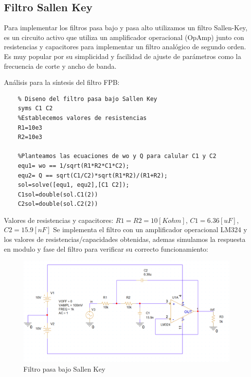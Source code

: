 \documentclass[12pt]{article}
\begin{document}
	\subsection{Filtro Sallen Key}
	Para implementar los filtros pasa bajo y pasa alto utilizamos un filtro Sallen-Key, es un circuito activo que utiliza un amplificador operacional (OpAmp) junto con resistencias y capacitores para implementar un filtro analógico de segundo orden. Es muy popular por su simplicidad y facilidad de ajuste de parámetros como la frecuencia de corte y ancho de banda.\newpage
	
	Análisis para la síntesis del filtro FPB:
	\begin{lstlisting}
	% Diseno del filtro pasa bajo Sallen Key
	syms C1 C2
	%Establecemos valores de resistencias
	R1=10e3
	R2=10e3
	
	%Planteamos las ecuaciones de wo y Q para calular C1 y C2
	equ1= wo == 1/sqrt(R1*R2*C1*C2);
	equ2= Q == sqrt(C1/C2)*sqrt(R1*R2)/(R1+R2);
	sol=solve([equ1, equ2],[C1 C2]);
	C1sol=double(sol.C1(2))
	C2sol=double(sol.C2(2))
	\end{lstlisting} 
	
	Valores de resistencias y capacitores: $R1=R2=10[Kohm]$, $C1=6.36[uF]$, $C2=15.9[nF]$
	Se implementa el filtro con un amplificador operacional LM324 y los valores de resistencias/capacidades obtenidas, ademas simulamos la respuesta en modulo y fase del filtro para verificar su correcto funcionamiento:
	\begin{figure}[h!]
		\includegraphics[width=1\linewidth]{Imagenes/FPB}
		\caption[Filtro pasa bajo Sallen Key]{Filtro pasa bajo Sallen Key}
		\label{fig:fpb}
	\end{figure}
	
\end{document}
